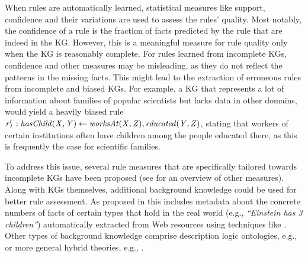 When rules are automatically learned, statistical measures like support, confidence and their variations are used to assess the rules' quality. Most notably, the confidence of a rule is the fraction of facts predicted by the rule that are indeed in the KG. However, this is a meaningful measure for rule quality only when the KG is reasonably complete. For rules learned from incomplete KGs, confidence and other measures may be misleading, as they do not reflect the patterns in the missing facts. This might lead to the extraction of erroneous rules from incomplete and biased KGs. For example, a KG that represents a lot of information about families of popular scientists but lacks data in other domains, would yield a heavily biased rule $\mathit{r_1':hasChild(X,Y)\leftarrow worksAt(X,Z), educated(Y,Z)}$, stating that workers of certain institutions often have children among the people educated there, as this is frequently the case for scientific families. 

To address this issue, several rule measures that are specifically tailored towards incomplete KGs have been proposed \cite{amie,DBLP:conf/www/ZupancD18} (see \cite{metrics-summary,Azevedo2007} for an overview of other measures). 
Along with KGs themselves, additional background knowledge could be used for better rule assessment. As proposed in \cite{carl} this includes metadata about the concrete numbers of facts of certain types that hold in the real world (e.g., \emph{``Einstein has 3 children''}) automatically extracted from Web resources using techniques like  \cite{paramita-acl-2017}. Other types of background knowledge comprise description logic ontologies, e.g., \cite{d2016ontology} or more general hybrid theories, e.g., \cite{DBLP:journals/tplp/Lisi10,DBLP:journals/tplp/JozefowskaLL10}.

